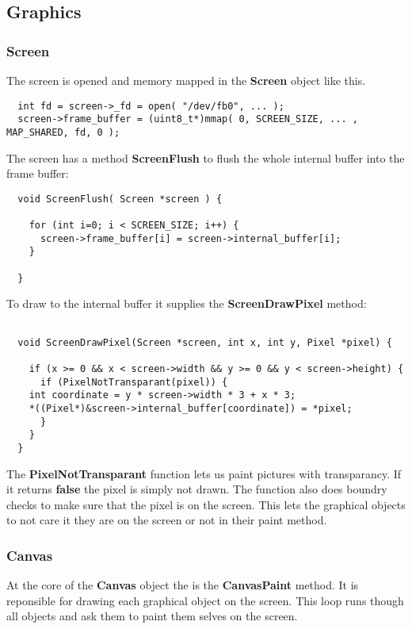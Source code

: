 \subsection{Graphics}

\subsubsection{Screen}

The screen is opened and memory mapped in the {\bf Screen} object like this.

\begin{lstlisting}
  int fd = screen->_fd = open( "/dev/fb0", ... );
  screen->frame_buffer = (uint8_t*)mmap( 0, SCREEN_SIZE, ... , MAP_SHARED, fd, 0 );
\end{lstlisting}

The screen has a method {\bf ScreenFlush} to flush the whole internal buffer into the frame buffer:

\begin{lstlisting}
  void ScreenFlush( Screen *screen ) {

    for (int i=0; i < SCREEN_SIZE; i++) {
      screen->frame_buffer[i] = screen->internal_buffer[i];
    }

  }
\end{lstlisting}

To draw to the internal buffer it supplies the {\bf ScreenDrawPixel} method:

\begin{lstlisting}

  void ScreenDrawPixel(Screen *screen, int x, int y, Pixel *pixel) {

    if (x >= 0 && x < screen->width && y >= 0 && y < screen->height) {
      if (PixelNotTransparant(pixel)) {
	int coordinate = y * screen->width * 3 + x * 3;
	*((Pixel*)&screen->internal_buffer[coordinate]) = *pixel;
      }
    }
  }
\end{lstlisting}

The {\bf PixelNotTransparant} function lets us paint pictures with
transparancy. If it returns {\bf false} the pixel is simply not drawn.
The function also does boundry checks to make sure that the pixel is
on the screen. This lets the graphical objects to not care it they
are on the screen or not in their paint method.

\subsubsection{Canvas}
At the core of the {\bf Canvas} object the is the {\bf CanvasPaint}
method. It is reponsible for drawing each graphical object on the
screen. This loop runs though all objects and ask them to paint them
selves on the screen.

